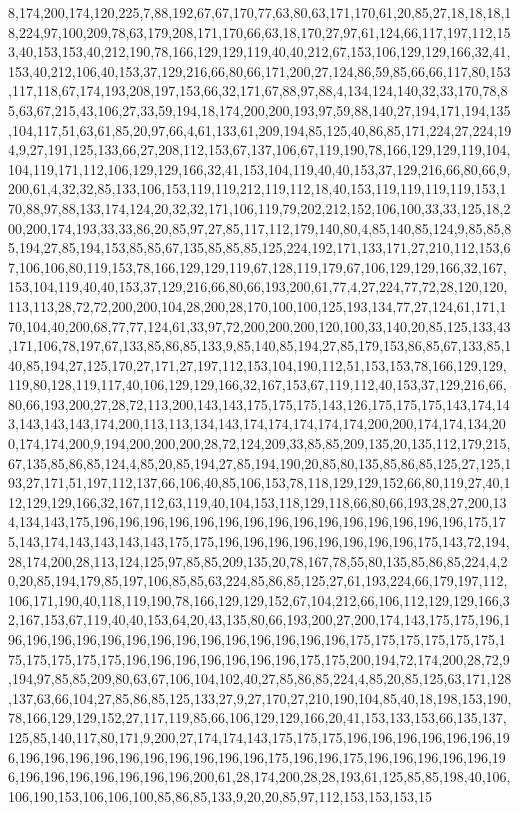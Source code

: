 8,174,200,174,120,225,7,88,192,67,67,170,77,63,80,63,171,170,61,20,85,27,18,18,18,18,224,97,100,209,78,63,179,208,171,170,66,63,18,170,27,97,61,124,66,117,197,112,153,40,153,153,40,212,190,78,166,129,129,119,40,40,212,67,153,106,129,129,166,32,41,153,40,212,106,40,153,37,129,216,66,80,66,171,200,27,124,86,59,85,66,66,117,80,153,117,118,67,174,193,208,197,153,66,32,171,67,88,97,88,4,134,124,140,32,33,170,78,85,63,67,215,43,106,27,33,59,194,18,174,200,200,193,97,59,88,140,27,194,171,194,135,104,117,51,63,61,85,20,97,66,4,61,133,61,209,194,85,125,40,86,85,171,224,27,224,194,9,27,191,125,133,66,27,208,112,153,67,137,106,67,119,190,78,166,129,129,119,104,104,119,171,112,106,129,129,166,32,41,153,104,119,40,40,153,37,129,216,66,80,66,9,200,61,4,32,32,85,133,106,153,119,119,212,119,112,18,40,153,119,119,119,119,153,170,88,97,88,133,174,124,20,32,32,171,106,119,79,202,212,152,106,100,33,33,125,18,200,200,174,193,33,33,86,20,85,97,27,85,117,112,179,140,80,4,85,140,85,124,9,85,85,85,194,27,85,194,153,85,85,67,135,85,85,85,125,224,192,171,133,171,27,210,112,153,67,106,106,80,119,153,78,166,129,129,119,67,128,119,179,67,106,129,129,166,32,167,153,104,119,40,40,153,37,129,216,66,80,66,193,200,61,77,4,27,224,77,72,28,120,120,113,113,28,72,72,200,200,104,28,200,28,170,100,100,125,193,134,77,27,124,61,171,170,104,40,200,68,77,77,124,61,33,97,72,200,200,200,120,100,33,140,20,85,125,133,43,171,106,78,197,67,133,85,86,85,133,9,85,140,85,194,27,85,179,153,86,85,67,133,85,140,85,194,27,125,170,27,171,27,197,112,153,104,190,112,51,153,153,78,166,129,129,119,80,128,119,117,40,106,129,129,166,32,167,153,67,119,112,40,153,37,129,216,66,80,66,193,200,27,28,72,113,200,143,143,175,175,175,143,126,175,175,175,143,174,143,143,143,143,174,200,113,113,134,143,174,174,174,174,174,200,200,174,174,134,200,174,174,200,9,194,200,200,200,28,72,124,209,33,85,85,209,135,20,135,112,179,215,67,135,85,86,85,124,4,85,20,85,194,27,85,194,190,20,85,80,135,85,86,85,125,27,125,193,27,171,51,197,112,137,66,106,40,85,106,153,78,118,129,129,152,66,80,119,27,40,112,129,129,166,32,167,112,63,119,40,104,153,118,129,118,66,80,66,193,28,27,200,134,134,143,175,196,196,196,196,196,196,196,196,196,196,196,196,196,196,196,175,175,143,174,143,143,143,143,175,175,196,196,196,196,196,196,196,196,175,143,72,194,28,174,200,28,113,124,125,97,85,85,209,135,20,78,167,78,55,80,135,85,86,85,224,4,20,20,85,194,179,85,197,106,85,85,63,224,85,86,85,125,27,61,193,224,66,179,197,112,106,171,190,40,118,119,190,78,166,129,129,152,67,104,212,66,106,112,129,129,166,32,167,153,67,119,40,40,153,64,20,43,135,80,66,193,200,27,200,174,143,175,175,196,196,196,196,196,196,196,196,196,196,196,196,196,196,196,175,175,175,175,175,175,175,175,175,175,175,196,196,196,196,196,196,196,175,175,200,194,72,174,200,28,72,9,194,97,85,85,209,80,63,67,106,104,102,40,27,85,86,85,224,4,85,20,85,125,63,171,128,137,63,66,104,27,85,86,85,125,133,27,9,27,170,27,210,190,104,85,40,18,198,153,190,78,166,129,129,152,27,117,119,85,66,106,129,129,166,20,41,153,133,153,66,135,137,125,85,140,117,80,171,9,200,27,174,174,143,175,175,175,196,196,196,196,196,196,196,196,196,196,196,196,196,196,196,196,196,175,196,196,175,196,196,196,196,196,196,196,196,196,196,196,196,196,200,61,28,174,200,28,28,193,61,125,85,85,198,40,106,106,190,153,106,106,100,85,86,85,133,9,20,20,85,97,112,153,153,153,15